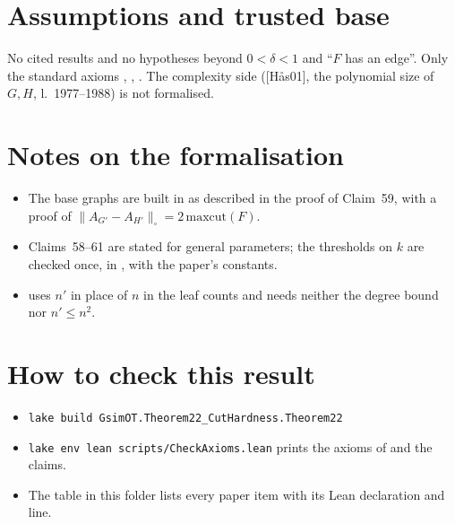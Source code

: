 \section{Assumptions and trusted base}
No cited results and no hypotheses beyond $0<\delta<1$ and ``$F$ has an edge''. Only the standard axioms
, , . The complexity side ([H\aa s01], the polynomial size
of $G,H$, l.~1977--1988) is not formalised.

\section{Notes on the formalisation}
\begin{itemize}
\item The base graphs are built in  as described in the proof of Claim~59, with a proof of
  $\|A_{G'}-A_{H'}\|_\square=2\,\mathrm{maxcut}(F)$.
\item Claims~58--61 are stated for general parameters; the thresholds on $k$ are checked once, in
  , with the paper's constants.
\item {} uses $n'$ in place of $n$ in the leaf counts and needs neither the degree bound
  nor $n'\le n^2$.
\end{itemize}

\section{How to check this result}
\begin{itemize}
\item \texttt{lake build GsimOT.Theorem22\_CutHardness.Theorem22}
\item \texttt{lake env lean scripts/CheckAxioms.lean} prints the axioms of
   and the claims.
\item The table  in this folder lists every paper item with its Lean
  declaration and line.
\end{itemize}

